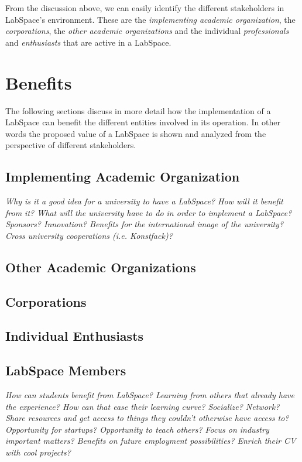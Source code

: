 \documentclass[a4paper, 11pt]{article}
\begin{document}
From the discussion above, we can easily identify the different stakeholders in LabSpace's environment. These are the \textit{implementing academic organization}, the \textit{corporations}, the \textit{other academic organizations} and the individual \textit{professionals} and \textit{enthusiasts} that are active in a LabSpace.

\section{Benefits}
The following sections discuss in more detail how the implementation of a LabSpace can benefit the different entities involved in its operation. In other words the proposed value of a LabSpace is shown and analyzed from the perspective of different stakeholders.

\subsection{Implementing Academic Organization}
\textit{Why is it a good idea for a university to have a LabSpace? How will it benefit from it? What will the university have to do in order to implement a LabSpace? Sponsors? Innovation? Benefits for the international image of the university? Cross university cooperations (i.e. Konstfack)?}

\subsection{Other Academic Organizations}

\subsection{Corporations}

\subsection{Individual Enthusiasts}

\subsection{LabSpace Members}
\textit{How can students benefit from LabSpace? Learning from others that already have the experience? How can that ease their learning curve? Socialize? Network? Share resources and get access to things they couldn't otherwise have access to? Opportunity for startups? Opportunity to teach others? Focus on industry important matters? Benefits on future employment possibilities? Enrich their CV with cool projects?}
\end{document}
